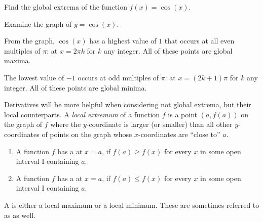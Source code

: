 \documentclass{ximera}
\begin{document}
\begin{example}
	Find the global extrema of the function $f(x) = \cos(x)$.
	\begin{explanation}
		Examine the graph of $y=\cos(x)$.
		\begin{image}
		\end{image}
		From the graph, $\cos(x)$ has a highest value of $1$ that occurs at all even multiples of $\pi$: at $x=2\pi k$ for $k$ any integer. 
		All of these points are global maxima.
		
		The lowest value of $-1$ occurs at odd multiples of $\pi$: at $x=(2k+1)\pi$ for $k$ any integer.
		All of these points are global minima.

	\end{explanation} 
\end{example}

Derivatives will be more helpful when considering not global extrema, but their local counterparts.
A \textit{local extremum} of a function $f$ is a point $(a,f(a))$ on the graph of  $f$ where the
$y$-coordinate is larger (or smaller) than all other $y$-coordinates
 of points on the graph whose $x$-coordinates are ``close to''  $a$. 

\begin{definition}\hfil{}
	\begin{enumerate}
		\item A function $f$ has a  at $x=a$, if $f(a)\geq
		  	f(x)$ for every $x$ in some open interval I containing $a$.
		\item A function $f$ has a  at $x=a$, if $f(a)\leq
		  	f(x)$ for every $x$  in some open interval I containing $a$.
	\end{enumerate}
	A  is either a local
	maximum or a local minimum. These are sometimes referred to as  as well.
\end{definition}
\end{document}
